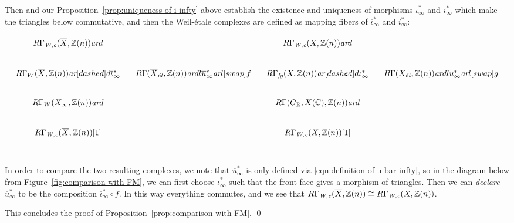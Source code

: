 \documentclass[leqno,12pt]{article}
\theoremstyle{plain}
\theoremstyle{definition}
\newcommand{\CC}{\mathbb{C}}
\newcommand{\RR}{\mathbb{R}}
\newcommand{\ZZ}{\mathbb{Z}}
\newcommand{\Wc}{\text{\it W,c}}
\newcommand{\ar}{\text{\it ar}}
\newcommand{\et}{\text{\it \'{e}t}}
\newcommand{\fg}{\text{\it fg}}
\begin{document}
Then \cite[Proposition~3.24]{Flach-Morin-2018} and our
Proposition~\ref{prop:uniqueness-of-i-infty} above establish the existence and
uniqueness of morphisms $\overline{\iota}_\infty^*$ and $i_\infty^*$ which make
the triangles below commutative, and then the Weil-\'{e}tale complexes are
defined as mapping fibers of $\overline{\iota}_\infty^*$ and $i_\infty^*$:

\[ \begin{tikzcd}[column sep=1em]
    R\Gamma_\Wc (\overline{X}, \ZZ (n))\ar{d} & & R\Gamma_\Wc (X, \ZZ (n))\ar{d} \\
    R\Gamma_W (\overline{X}, \ZZ(n)) \ar[dashed]{d}{\overline{\iota}_\infty^*} & R\Gamma (\overline{X}_\et, \ZZ(n)) \ar{dl}{\overline{u}_\infty^*}\ar{l}[swap]{f} & R\Gamma_\fg (X, \ZZ(n))  \ar[dashed]{d}{\iota_\infty^*} & R\Gamma (X_\et, \ZZ(n)) \ar{dl}{u_\infty^*}\ar{l}[swap]{g} \\
    R\Gamma_W (X_\infty, \ZZ (n))\ar{d} & & R\Gamma (G_\RR, X (\CC), \ZZ (n))\ar{d} \\
    R\Gamma_\Wc (\overline{X}, \ZZ (n))[1] & & R\Gamma_\Wc (X, \ZZ (n))[1] \\
  \end{tikzcd} \]

In order to compare the two resulting complexes, we note that
$\overline{u}_\infty^*$ is only defined via
\eqref{eqn:definition-of-u-bar-infty}, so in the diagram below from
Figure~\ref{fig:comparison-with-FM}, we can first choose
$\overline{\iota}_\infty^*$ such that the front face gives a morphism of
triangles. Then we can \emph{declare} $\overline{u}_\infty^*$ to be the
composition $\overline{\iota}_\infty^* \circ f$. In this way everything
commutes, and we see that
$R\Gamma_\Wc (\overline{X}, \ZZ(n)) \cong R\Gamma_\Wc (X, \ZZ(n))$.

\vspace{1em}

This concludes the proof of Proposition~\ref{prop:comparison-with-FM}. \qed
\end{document}
